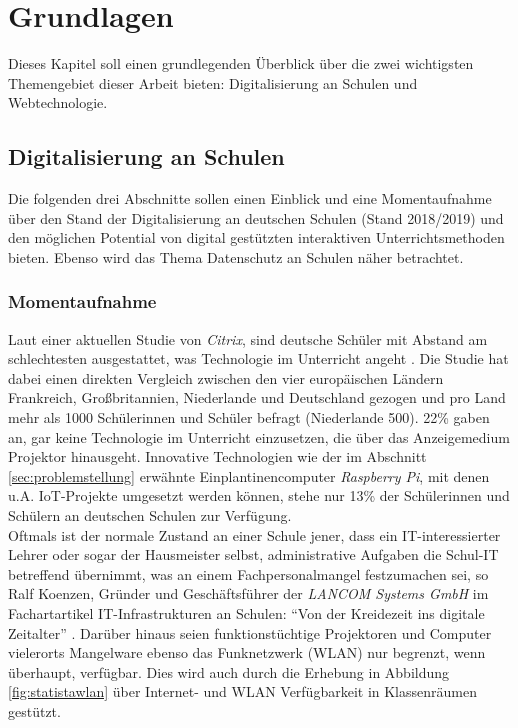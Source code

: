 \section{Grundlagen}\label{sec:grundlagen}
Dieses Kapitel soll einen grundlegenden Überblick über die zwei wichtigsten Themengebiet dieser Arbeit bieten: Digitalisierung an Schulen und Webtechnologie.

\subsection{Digitalisierung an Schulen}\label{sec:digianschulen}
Die folgenden drei Abschnitte sollen einen Einblick und eine Momentaufnahme über den Stand der Digitalisierung an deutschen Schulen (Stand 2018/2019) und den möglichen Potential von digital gestützten interaktiven Unterrichtsmethoden bieten. Ebenso wird das Thema Datenschutz an Schulen näher betrachtet.

\subsubsection{Momentaufnahme}\label{sec:technikunterricht}
Laut einer aktuellen Studie von \emph{Citrix}, sind deutsche Schüler mit Abstand am schlechtesten 
ausgestattet, was Technologie im Unterricht angeht \cite{Technisc27:online}. Die Studie hat dabei einen direkten Vergleich zwischen den vier europäischen Ländern Frankreich, Großbritannien, Niederlande und Deutschland gezogen und pro Land mehr als 1000 Schülerinnen und Schüler befragt (Niederlande 500). 22\% gaben an, gar keine Technologie im Unterricht einzusetzen, die über das Anzeigemedium Projektor hinausgeht. Innovative Technologien wie der im Abschnitt \ref{sec:problemstellung} erwähnte Einplantinencomputer \emph{Raspberry Pi}, mit denen u.A. IoT-Projekte umgesetzt werden können, stehe nur 13\% der Schülerinnen und Schülern an deutschen Schulen zur Verfügung. \\ 

Oftmals ist der normale Zustand an einer Schule jener, dass ein IT-interessierter Lehrer oder sogar der Hausmeister selbst, administrative Aufgaben die Schul-IT betreffend übernimmt, was an einem Fachpersonalmangel festzumachen sei, so Ralf Koenzen, Gründer und Geschäftsführer der \emph{LANCOM Systems GmbH} im Fachartartikel IT-Infrastrukturen an Schulen: "`Von der Kreidezeit ins digitale Zeitalter"' \cite{Koenzen2018}. Darüber hinaus seien funktionstüchtige Projektoren und Computer vielerorts Mangelware ebenso das Funknetzwerk (WLAN) nur begrenzt, wenn überhaupt, verfügbar. Dies wird auch durch die Erhebung in Abbildung \ref{fig:statistawlan} über Internet- und WLAN Verfügbarkeit in Klassenräumen gestützt. 

